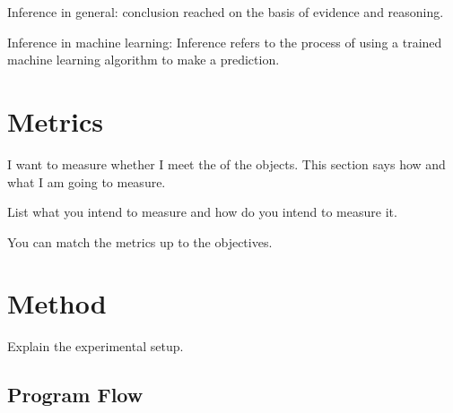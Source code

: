 Inference in general: conclusion reached on the basis of evidence and reasoning.

Inference in machine learning: Inference refers to the process of using a trained machine learning algorithm to make a prediction.

\section{Metrics}

I want to measure whether I meet the of the objects.
This section says how and what I am going to measure.

List what you intend to measure and how do you intend to measure it.

You can match the metrics up to the objectives.

\section{Method}

Explain the experimental setup.
\subsection{Program Flow}